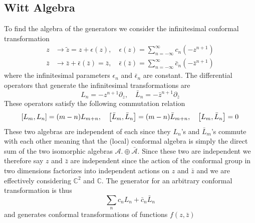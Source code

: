 \documentclass[11pt, a4paper, oneside]{book}
\theoremstyle{definition} %
\begin{document}
\begin{appendices}
\section{Witt Algebra}
To find the algebra of the generators we consider the infinitesimal conformal transformation
\begin{equation}
\begin{split}
	z &\rightarrow \tilde{z} = z + \epsilon(z), \quad \epsilon(z) = \sum_{n = -\infty}^\infty c_n (-z^{n+1}) \\
	\bar{z} &\rightarrow \bar{z} + \bar{\epsilon}(\bar{z}) = \bar{z}, \quad \bar{\epsilon}(\bar{z}) = \sum_{n = -\infty}^\infty \bar{c}_n (- \bar{z}^{n+1})
\end{split}
\end{equation}
where the infinitesimal parameters $\epsilon_n$ and $\bar{\epsilon}_n$ are constant. The differential operators that generate the infinitesimal transformations are
\begin{equation}
	L_n = -z^{n+1} \partial_z, \quad \bar{L}_n = - \bar{z}^{n+1} \partial_{\bar{z}}
\end{equation}
These operators satisfy the following commutation relation
\begin{equation}
	\comm{L_m}{L_n} = (m-n)L_{m+n}, \quad \comm{\bar{L}_m}{\bar{L}_n} = (m - n) \bar{L}_{m + n}, \quad \comm{L_m}{\bar{L}_n} = 0
\end{equation}
These two algebras are independent of each since they $L_n$'s and $\bar{L}_m$'s commute with each other meaning that the (local) conformal algebra is simply the direct sum of the two isomorphic algebras $\mathcal{A}. \oplus \bar{\mathcal{A}}$. Since these two are independent we therefore say $z$ and $\bar{z}$ are independent since the action of the conformal group in two dimensions factorizes into independent actions on $z$ and $\bar{z}$ and we are effectively considering $\mathbb{C}^2$ and $\mathbb{C}$. The generator for an arbitrary conformal transformation is thus
\begin{equation}
	\sum_n c_n L_n + \bar{c}_n \bar{L}_n
\end{equation}
and generates conformal transformations of functions $f(z, \bar{z})$ \cite{Schellekens,Francesco}


\end{appendices}
\end{document}
